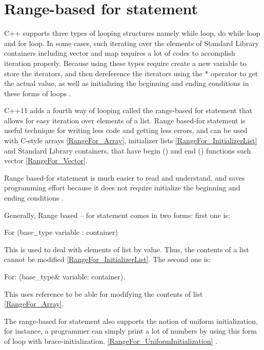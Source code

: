 \documentclass[11pt]{report}
\begin{document}
\section{Range-based for statement}
\label{section: Range-based for statement}
C++ supports three types of looping structures namely while loop, do while loop and for loop. In some cases, such iterating over the elements of Standard Library containers including vector and map requires a lot of codes to accomplish iteration properly. Because using these types require create a new variable to store the iterators, and then dereference the iterators using the * operator to get the actual value, as well as initializing the beginning and ending conditions in these forms of loops \cite{Horstmann:2008:BC}.


C++11 adds a fourth way of looping called the range-based for statement that allows for easy iteration over elements of a list. Range based-for statement is useful technique for writing less code and getting less errors, and can be used with C-style arrays \ref{RangeFor_Array}, initializer lists \ref{RangeFor_InitializerList} and Standard Library containers, that have begin () and end () functions such vector \ref{RangeFor_Vector}. 


Range based-for statement is much easier to read and understand, and saves programming effort because it does not require initialize the beginning and ending conditions \cite{Overland:2011:CWF}.


Generally, Range based – for statement comes in two forms: first one is:
\begin{center}
For (base\_type  variable : container)
\end{center} 

This is used to deal with elements of list by value. Thus, the contents of a list cannot be modified \ref{RangeFor_InitializerList}. The second one is:
\begin{center}
For: (base\_type\& variable: container).
\end{center}

This uses reference to be able for modifying the contents of list \ref{RangeFor_Array}.


The range-based for statement also supports the notion of uniform initialization, for instance, a programmer can simply print a lot of numbers by using this form of loop with brace-initialization. \ref{RangeFor_UniformInitialization} \cite{Overland:2011:CWF}.

\end{document}
